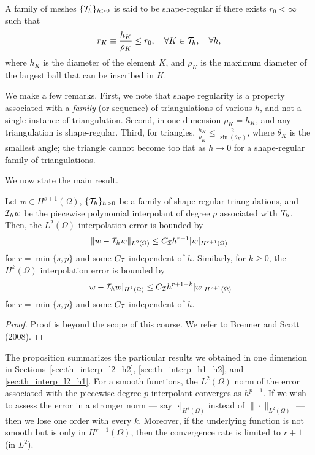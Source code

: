 \begin{definition}
  \label{def:th_shape_reg_affine}
  A family of meshes $\{ \mathcal{T}_h \}_{h > 0}$ is said to be shape-regular if there exists $r_0 < \infty$ such that 
  \begin{equation*}
    r_K \equiv \frac{h_K}{\rho_K} \leq r_0, \quad \forall K \in \mathcal{T}_h, \quad \forall h ,
  \end{equation*}
  where $h_K$ is the diameter of the element $K$, and $\rho_K$ is the maximum diameter of the largest ball that can be inscribed in $K$.
\end{definition}
We make a few remarks. First, we note that shape regularity is a property associated with a \emph{family} (or sequence) of triangulations of various $h$, and not a single instance of triangulation.  Second, in one dimension $\rho_K = h_K$, and any triangulation is shape-regular.  Third, for triangles, $\frac{h_K}{\rho_K} \leq \frac{2}{\sin(\theta_K)}$, where $\theta_K$ is the smallest angle; the triangle cannot become too flat as $h \to 0$ for a shape-regular family of triangulations.  

We now state the main result.
\begin{proposition}
  \label{prop:th_interp_gen}
  Let $w \in H^{s+1}(\Omega)$, $\{\mathcal{T}_h\}_{h > 0}$ be a family of shape-regular triangulations, and $\mathcal{I}_h w$ be the piecewise polynomial interpolant of degree $p$ associated with $\mathcal{T}_h$. Then, the $L^2(\Omega)$ interpolation error is bounded by
\begin{align*}
  \| w - \mathcal{I}_h w \|_{L^2(\Omega)} \leq C_{\mathcal{I}} h^{r+1} | w |_{H^{r+1}(\Omega)}
\end{align*}
for $r = \min\{ s,p \}$ and some $C_{\mathcal{I}}$ independent of $h$. Similarly, for $k \geq 0$, the $H^k(\Omega)$ interpolation error is bounded by
\begin{align*}
  | w - \mathcal{I}_h w |_{H^k(\Omega)} \leq C_{\mathcal{I}} h^{r+1-k} | w |_{H^{r+1}(\Omega)}
\end{align*}
for $r = \min\{ s,p \}$ and some $C_{\mathcal{I}}$ independent of $h$.
\begin{proof}
  Proof is beyond the scope of this course. We refer to Brenner and Scott (2008).
\end{proof}
\end{proposition}
The proposition summarizes the particular results we obtained in one dimension in Sections~\ref{sec:th_interp_l2_h2}, \ref{sec:th_interp_h1_h2}, and \ref{sec:th_interp_l2_h1}.  For a smooth functions, the $L^2(\Omega)$ norm of the error associated with the piecewise degree-$p$ interpolant converges as $h^{p+1}$. If we wish to assess the error in a stronger norm --- say $|\cdot|_{H^k(\Omega)}$ instead of $\| \cdot \|_{L^2(\Omega)}$ --- then we lose one order with every $k$.  Moreover, if the underlying function is not smooth but is only in $H^{r+1}(\Omega)$, then the convergence rate is limited to $r+1$ (in $L^2$).

